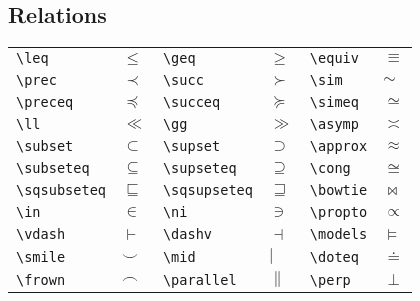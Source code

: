 \subsection{Relations}
\begin{table}[!htbp]
    \centering
    \begin{tabular}{lp{2cm}lp{2cm}lp{2cm}}
	\verb|\leq|	& $\leq$ &
	\verb|\geq|	& $\geq$ & 
	\verb|\equiv|	& $\equiv$	\\ 
	\verb|\prec|	& $\prec$    & 
	\verb|\succ|	& $\succ$    & 
	\verb|\sim|	& $\sim$	\\ 
	\verb|\preceq|	& $\preceq$    & 
	\verb|\succeq|	& $\succeq$    & 
	\verb|\simeq|	& $\simeq$	\\ 
	\verb|\ll|	& $\ll$    & 
	\verb|\gg|	& $\gg$    & 
	\verb|\asymp|	& $\asymp$	\\ 
	\verb|\subset|	& $\subset$    & 
	\verb|\supset|	& $\supset$    & 
	\verb|\approx|	& $\approx$	\\ 
	\verb|\subseteq|	& $\subseteq$	& 
	\verb|\supseteq|	& $\supseteq$    & 
	\verb|\cong|	& $\cong$	\\ 
	\verb|\sqsubseteq|  & $\sqsubseteq$ & 
	\verb|\sqsupseteq|	& $\sqsupseteq$	&   
	\verb|\bowtie|	& $\bowtie$	\\ 
	\verb|\in|	& $\in$    & 
	\verb|\ni|	& $\ni$    & 
	\verb|\propto|	& $\propto$		\\   
	\verb|\vdash|	& $\vdash$    & 
	\verb|\dashv|	& $\dashv$    & 
	\verb|\models|	& $\models$	\\ 
	\verb|\smile|	& $\smile$    & 
	\verb|\mid|	& $\mid$    & 
	\verb|\doteq|	& $\doteq$	\\
	\verb|\frown|	& $\frown$    & 
	\verb|\parallel|	& $\parallel$    & 
	\verb|\perp|	& $\perp$	\\
    \end{tabular}
\end{table}

